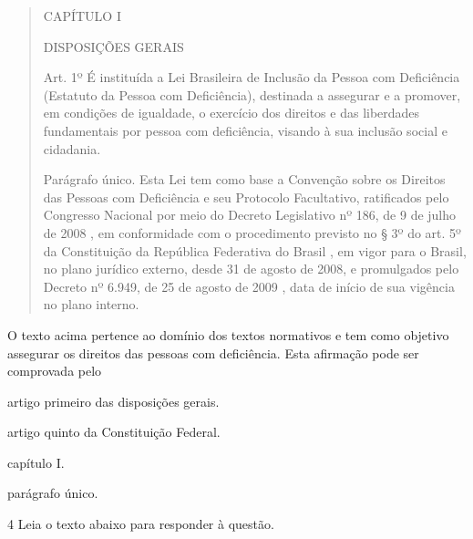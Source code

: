 \begin{quote}

CAPÍTULO I

DISPOSIÇÕES GERAIS

Art. 1º É instituída a Lei Brasileira de Inclusão da Pessoa com
Deficiência (Estatuto da Pessoa com Deficiência), destinada a assegurar
e a promover, em condições de igualdade, o exercício dos direitos e das
liberdades fundamentais por pessoa com deficiência, visando à sua
inclusão social e cidadania.

Parágrafo único. Esta Lei tem como base a Convenção sobre os Direitos
das Pessoas com Deficiência e seu Protocolo Facultativo, ratificados
pelo Congresso Nacional por meio do Decreto Legislativo nº 186, de 9 de
julho de 2008 , em conformidade com o procedimento previsto no § 3º do
art. 5º da Constituição da República Federativa do Brasil , em vigor
para o Brasil, no plano jurídico externo, desde 31 de agosto de 2008, e
promulgados pelo Decreto nº 6.949, de 25 de agosto de 2009 , data de
início de sua vigência no plano interno.

\end{quote}


O texto acima pertence ao domínio dos textos normativos e tem como
objetivo assegurar os direitos das pessoas com deficiência. Esta
afirmação pode ser comprovada pelo

\begin{escolha}
    
    \item artigo primeiro das disposições gerais.
    
    \item artigo quinto da Constituição Federal.
    
    \item capítulo I.
    
    \item parágrafo único.

\end{escolha}

\num{4} Leia o texto abaixo para responder à questão. 

